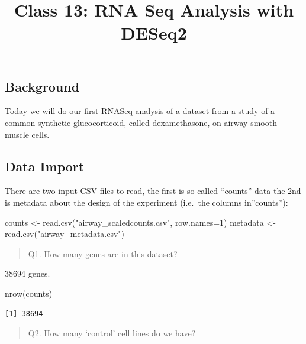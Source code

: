 \documentclass[
  letterpaper,
  DIV=11,
  numbers=noendperiod]{scrartcl}
\title{Class 13: RNA Seq Analysis with DESeq2}
\author{}
\date{}
\newenvironment{Shaded}{\begin{snugshade}}{\end{snugshade}}
\newcommand{\AttributeTok}[1]{\textcolor[rgb]{0.40,0.45,0.13}{#1}}
\newcommand{\DecValTok}[1]{\textcolor[rgb]{0.68,0.00,0.00}{#1}}
\newcommand{\FunctionTok}[1]{\textcolor[rgb]{0.28,0.35,0.67}{#1}}
\newcommand{\NormalTok}[1]{\textcolor[rgb]{0.00,0.23,0.31}{#1}}
\newcommand{\OtherTok}[1]{\textcolor[rgb]{0.00,0.23,0.31}{#1}}
\newcommand{\StringTok}[1]{\textcolor[rgb]{0.13,0.47,0.30}{#1}}
\begin{document}
\maketitle


\subsection{Background}\label{background}

Today we will do our first RNASeq analysis of a dataset from a study of
a common synthetic glucocorticoid, called dexamethasone, on airway
smooth muscle cells.

\subsection{Data Import}\label{data-import}

There are two input CSV files to read, the first is so-called ``counts''
data the 2nd is metadata about the design of the experiment (i.e.~the
columns in''counts''):

\begin{Shaded}
\begin{Highlighting}[]
\NormalTok{counts }\OtherTok{\textless{}{-}} \FunctionTok{read.csv}\NormalTok{(}\StringTok{"airway\_scaledcounts.csv"}\NormalTok{, }\AttributeTok{row.names=}\DecValTok{1}\NormalTok{)}
\NormalTok{metadata }\OtherTok{\textless{}{-}} \FunctionTok{read.csv}\NormalTok{(}\StringTok{"airway\_metadata.csv"}\NormalTok{)}
\end{Highlighting}
\end{Shaded}

\begin{quote}
Q1. How many genes are in this dataset?
\end{quote}

38694 genes.

\begin{Shaded}
\begin{Highlighting}[]
\FunctionTok{nrow}\NormalTok{(counts)}
\end{Highlighting}
\end{Shaded}

\begin{verbatim}
[1] 38694
\end{verbatim}

\begin{quote}
Q2. How many `control' cell lines do we have?
\end{quote}
\end{document}
